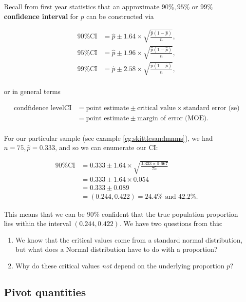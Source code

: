Recall from first year statistics that an approximate \(90\%,95\%\) or \(99\%\) \textbf{confidence interval} for \(p\) can be constructed via 

\begin{align*}
    90\% \text{CI} &= \hat{p} \pm 1.64 \times \sqrt{\frac{\hat{p}(1-\hat{p})}{n}},\\
    95\% \text{CI} &= \hat{p} \pm 1.96 \times \sqrt{\frac{\hat{p}(1-\hat{p})}{n}},\\
    99\% \text{CI} &= \hat{p} \pm 2.58 \times \sqrt{\frac{\hat{p}(1-\hat{p})}{n}},\\
\end{align*}

or in general terms 

\begin{align*}
    \text{condfidence level} \text{CI} &= \text{point estimate} \pm \text{critical value} \times \text{standard error (se)}\\
    &= \text{point estimate} \pm \text{margin of error (MOE)}.\\
\end{align*}

For our particular sample (see example \ref{eg:skittlesandmnms}), we had \(n=75, \hat{p} = 0.333\), and so we can enumerate our CI:

\begin{align*}
    90\% \text{CI} &= 0.333 \pm 1.64 \times \sqrt{\frac{0.333 \times 0.667}{75}}\\
    &= 0.333 \pm 1.64 \times 0.054\\
    &= 0.333 \pm 0.089\\
    &= (0.244, 0.422) = 24.4\% \text{ and } 42.2\%.
\end{align*}

This means that we can be \(90\%\) confident that the true population proportion lies within the interval \((0.244, 0.422)\). 
We have two questions from this:

\begin{enumerate}
    \item We know that the critical values come from a standard normal distribution, but what does a Normal distribution have to do with a proportion?
    \item Why do these critical values \textit{not} depend on the underlying proportion \(p\)?
\end{enumerate}

\subsection{Pivot quantities} \label{subsec:pivot quants}

